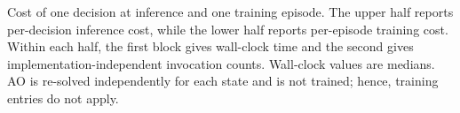 \documentclass[12pt,onecolumn]{IEEEtran}
\begin{document}
\begin{table}[t]
\centering
\caption{Cost of one decision at inference and one training episode.
The upper half reports per-decision inference cost, while the lower half
reports per-episode training cost.
Within each half, the first block gives wall-clock time and the second
gives implementation-independent invocation counts.
Wall-clock values are medians.
AO is re-solved independently for each state and is not trained; hence,
training entries do not apply.}
\label{tab:latency}

\end{table}
\end{document}
